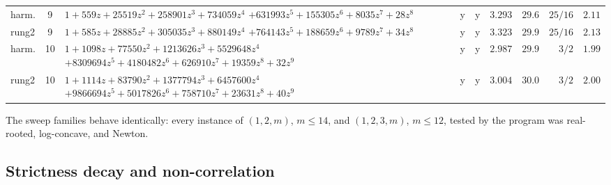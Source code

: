 \documentclass[11pt,a4paper]{article}
\numberwithin{equation}{section}
\theoremstyle{plain}
\theoremstyle{definition}
\theoremstyle{remark}
\begin{document}
\begin{table}[htbp]
\begin{tabularx}{\textwidth}{@{} l c >{\raggedright\arraybackslash}X c c r r r r @{}}
harm. & 9 & $1+559z+25519z^2+258901z^3+734059z^4$\newline
$+631993z^5+155305z^6+8035z^7+28z^8$ & y & y & $3.293$ & $29.6$ & $25/16$ & $2.11$ \\
rung2 & 9 & $1+585z+28885z^2+305035z^3+880149z^4$\newline
$+764143z^5+188659z^6+9789z^7+34z^8$ & y & y & $3.323$ & $29.9$ & $25/16$ & $2.13$ \\
harm. & 10 & $1+1098z+77550z^2+1213626z^3+5529648z^4$\newline
$+8309694z^5+4180482z^6+626910z^7+19359z^8+32z^9$ & y & y & $2.987$
& $29.9$ & $3/2$ & $1.99$ \\
rung2 & 10 & $1+1114z+83790z^2+1377794z^3+6457600z^4$\newline
$+9866694z^5+5017826z^6+758710z^7+23631z^8+40z^9$ & y & y & $3.004$
& $30.0$ & $3/2$ & $2.00$ \\
\bottomrule
\end{tabularx}
\end{table}

The sweep families behave identically: every instance of $(1,2,m)$,
$m\le14$, and $(1,2,3,m)$, $m\le12$, tested by the program was
real-rooted, log-concave, and Newton.

\subsection{Strictness decay and non-correlation}
\end{document}
